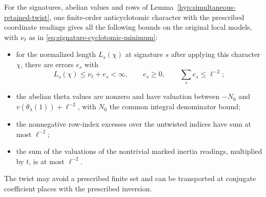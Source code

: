 \begin{proposition}\label{prop:one-retained-character}
For the signatures, abelian values and rows of
Lemma~\ref{hyp:simultaneous-retained-twist}, one finite-order anticyclotomic character
with the prescribed coordinate readings gives all the
following bounds on the original local models, with \(\nu_\ell\) as in
\eqref{eq:signature-cyclotomic-minimum}:
\begin{itemize}
\item for the normalized length \(L_s(\chi)\) at signature \(s\) after applying this character \(\chi\), there are errors \(e_s\) with
\[
 L_s(\chi)\le\nu_\ell+e_s<\infty,\qquad e_s\ge0,\qquad\sum_s e_s\le\ell^{-2};
\]
\item the abelian theta values are nonzero and have valuation
  between \(-N_0\) and \(v(\theta_\lambda(1))+\ell^{-2}\),
  with \(N_0\) the common integral denominator bound;
\item the nonnegative row-index excesses over the untwisted
  indices have sum at most \(\ell^{-2}\);
\item the sum of the valuations of the nontrivial marked
  inertia readings, multiplied by \(t\), is at most \(\ell^{-2}\).
\end{itemize}
The twist may avoid a prescribed finite set and can be
transported at conjugate coefficient places with the
prescribed inversion.
\end{proposition}

